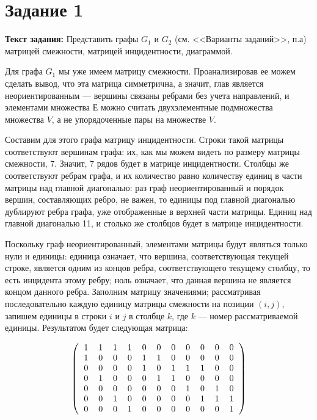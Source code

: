 \documentclass[12pt]{article}
\begin{document}
	\section{Задание 1}
	\label{task1}
	{\bf Текст задания:} Представить графы $G_1$ и $G_2$ (см. <<Варианты заданий>>, п.а) матрицей смежности, матрицей инцидентности, диаграммой. 
	
	Для графа $G_1$ мы уже имеем матрицу смежности. Проанализировав ее можем сделать вывод, что эта матрица симметрична, а значит, глав является неориентированным --- вершины связаны ребрами без учета направлений, и элементами множества $Е$ можно считать двухэлементные подмножества множества $V$, а не упорядоченные пары на множестве $V$. 
	
	Составим для этого графа матрицу инцидентности. Строки такой матрицы соответствуют вершинам графа: их, как мы можем видеть по размеру матрицы смежности, 7. Значит, 7 рядов будет в матрице инцидентности. Столбцы же соответствуют ребрам графа, и их количество равно количеству единиц в части матрицы над главной диагональю: раз граф неориентированный и порядок вершин, составляющих ребро, не важен, то единицы под главной диагональю дублируют ребра графа, уже отображенные в верхней части матрицы. Единиц над главной диагональю 11, и столько же столбцов будет в матрице инцидентности. 
	
	Поскольку граф неориентированный, элементами матрицы будут являться только нули и единицы: единица означает, что вершина, соответствующая текущей строке, является одним из концов ребра, соответствующего текущему столбцу, то есть инцидента этому ребру; ноль означает, что данная вершина не является концом данного ребра. Заполним матрицу значениями; рассматривая последовательно каждую единицу матрицы смежности на позиции $(i, j)$, запишем единицы в строки $i$ и $j$ в столбце $k$, где $k$ --- номер рассматриваемой единицы. Результатом будет следующая матрица:
	
	$$
	\left(\begin{tabular} {c c c c c c c c c c c}
		1 & 1 & 1 & 1 & 0 & 0 & 0 & 0 & 0 & 0 & 0 \\
		1 & 0 & 0 & 0 & 1 & 1 & 0 & 0 & 0 & 0 & 0 \\
		0 & 0 & 0 & 0 & 1 & 0 & 1 & 1 & 1 & 0 & 0 \\
		0 & 1 & 0 & 0 & 0 & 1 & 1 & 0 & 0 & 0 & 0 \\
		0 & 0 & 0 & 0 & 0 & 0 & 0 & 1 & 0 & 1 & 0 \\
		0 & 0 & 1 & 0 & 0 & 0 & 0 & 0 & 1 & 1 & 1 \\
		0 & 0 & 0 & 1 & 0 & 0 & 0 & 0 & 0 & 0 & 1 \\
	\end{tabular}
	\right)
	$$
	
\end{document}
